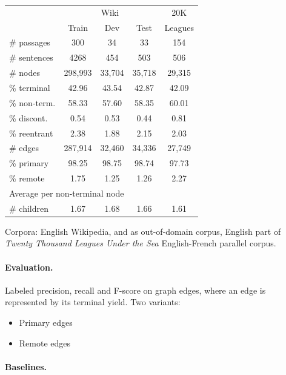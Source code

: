 \documentclass[a0,portrait]{a0poster}
\begin{document}
\begin{multicols}{2}
\begin{table}
	\vspace{-2cm}
	\begin{tabular}{l|ccc|c}
		& \multicolumn{3}{c|}{Wiki} & 20K \\
		& \small Train & \small Dev & \small Test & Leagues \\
		\hline
		\# passages & 300 & 34 & 33 & 154 \\
		\# sentences & 4268 & 454 & 503 & 506 \\
		\hline
		\# nodes & 298,993 & 33,704 & 35,718 & 29,315 \\
		\% terminal & 42.96 & 43.54 & 42.87 & 42.09 \\
		\% non-term. & 58.33 & 57.60 & 58.35 & 60.01 \\
		\% discont. & 0.54 & 0.53 & 0.44 & 0.81 \\
		\% reentrant & 2.38 & 1.88 & 2.15 & 2.03 \\
		\hline
		\# edges & 287,914 & 32,460 & 34,336 & 27,749 \\
		\% primary & 98.25 & 98.75 & 98.74 & 97.73 \\
		\% remote & 1.75 & 1.25 & 1.26 & 2.27 \\
		\hline
		\multicolumn{3}{l}{\footnotesize Average per non-terminal node} \\
		\# children & 1.67 & 1.68 & 1.66 & 1.61 
	\end{tabular}
\end{table}

Corpora: English Wikipedia, and as
out-of-domain corpus, English part of \textit{Twenty Thousand Leagues Under the Sea}
English-French parallel corpus.

\paragraph{Evaluation.}
Labeled precision, recall and F-score on graph edges, where an edge is represented
by its terminal yield.
Two variants:
\begin{itemize}
\item Primary edges
\item Remote edges
\end{itemize}

\paragraph{Baselines.}


\end{multicols}
\end{document}
